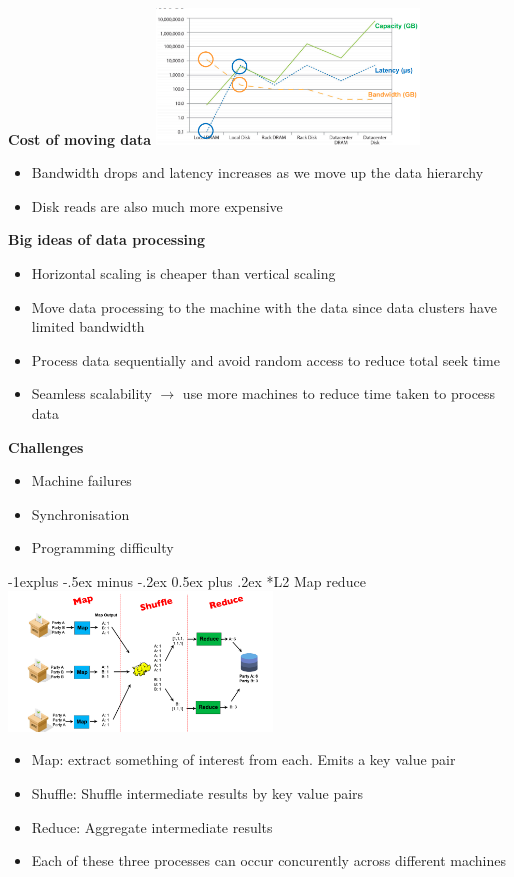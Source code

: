 \documentclass[10pt, landscape]{article}
\makeatletter
\renewcommand{\subsection}{\@startsection{subsection}{2}{0mm}%
                                {-1explus -.5ex minus -.2ex}%
                                {0.5ex plus .2ex}%
                                {\normalfont\normalsize\bfseries}}
\makeatother
\begin{document}
\begin{multicols}{4}
\textbf{Cost of moving data }
\includegraphics*[width=7cm]{data_cost}
\begin{itemize}
  \item Bandwidth drops and latency increases as we move up the data hierarchy 
  \item Disk reads are also much more expensive 
\end{itemize}

\textbf{Big ideas of data processing}
\begin{itemize}
  \item Horizontal scaling is cheaper than vertical scaling 
  \item Move data processing to the machine with the data since data clusters have limited bandwidth
  \item Process data sequentially and avoid random access to reduce total seek time 
  \item Seamless scalability $\rightarrow$ use more machines to reduce time taken to process data
\end{itemize}

\textbf{Challenges}
\begin{itemize}
  \item Machine failures
  \item Synchronisation 
  \item Programming difficulty
\end{itemize}

\subsection*{L2 Map reduce}
\includegraphics*[width=7cm]{map_reduce}
\begin{itemize}
  \item Map: extract something of interest from each. Emits a key value pair 
  \item Shuffle: Shuffle intermediate results by key value pairs 
  \item Reduce: Aggregate intermediate results
  \item Each of these three processes can occur concurently across different machines
\end{itemize}


\end{multicols}
\end{document}
